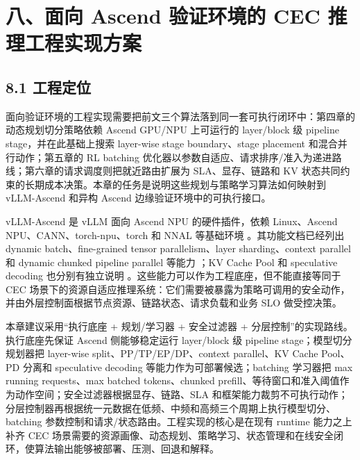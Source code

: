 \clearpage
{}
\section*{八、面向 Ascend 验证环境的 CEC 推理工程实现方案}

\subsection*{8.1 工程定位}

面向验证环境的工程实现需要把前文三个算法落到同一套可执行闭环中：第四章的动态规划切分策略依赖 Ascend GPU/NPU 上可运行的 layer/block 级 pipeline stage，并在此基础上搜索 layer-wise stage boundary、stage placement 和混合并行动作；第五章的 RL batching 优化器以参数自适应、请求排序/准入为递进路线；第六章的请求调度则把就近路由扩展为 SLA、显存、链路和 KV 状态共同约束的长期成本决策。本章的任务是说明这些规划与策略学习算法如何映射到 vLLM-Ascend 和异构 Ascend 边缘验证环境中的可执行接口。

vLLM-Ascend 是 vLLM 面向 Ascend NPU 的硬件插件，依赖 Linux、Ascend NPU、CANN、torch-npu、torch 和 NNAL 等基础环境 \cite{vllmascend2026documentation,vllmascend2026installation}。其功能文档已经列出 dynamic batch、fine-grained tensor parallelism、layer sharding、context parallel 和 dynamic chunked pipeline parallel 等能力 \cite{vllmascend2026features}；KV Cache Pool 和 speculative decoding 也分别有独立说明 \cite{vllmascend2026kvpool,vllmascend2026speculative}。这些能力可以作为工程底座，但不能直接等同于 CEC 场景下的资源自适应推理系统：它们需要被暴露为策略可调用的安全动作，并由外层控制面根据节点资源、链路状态、请求负载和业务 SLO 做受控决策。

本章建议采用“执行底座 + 规划/学习器 + 安全过滤器 + 分层控制”的实现路线。执行底座先保证 Ascend 侧能够稳定运行 layer/block 级 pipeline stage；模型切分规划器把 layer-wise split、PP/TP/EP/DP、context parallel、KV Cache Pool、PD 分离和 speculative decoding 等能力作为可部署候选；batching 学习器把 max running requests、max batched tokens、chunked prefill、等待窗口和准入阈值作为动作空间；安全过滤器根据显存、链路、SLA 和框架能力裁剪不可执行动作；分层控制器再根据统一元数据在低频、中频和高频三个周期上执行模型切分、batching 参数控制和请求/状态路由。工程实现的核心是在现有 runtime 能力之上补齐 CEC 场景需要的资源画像、动态规划、策略学习、状态管理和在线安全闭环，使算法输出能够被部署、压测、回退和解释。

